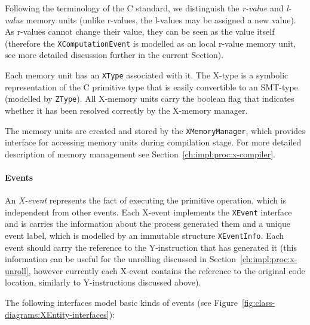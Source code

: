 Following the terminology of the C standard, we distinguish the \textit{r-value} and \textit{l-value} memory units (unlike r-values, the l-values may be assigned a new value).
As r-values cannot change their value, they can be seen as the value itself (therefore the \texttt{XComputationEvent} is modelled as an local r-value memory unit, see more detailed discussion further in the current Section).

Each memory unit has an \texttt{XType} associated with it.
The X-type is a symbolic representation of the C primitive type%
%
%
that is easily convertible to an SMT-type (modelled by \texttt{ZType}). %
All X-memory units carry the boolean flag that indicates whether it has been resolved correctly by the X-memory manager.

The memory units are created and stored by the \texttt{XMemoryManager}, which provides interface for accessing memory units during compilation stage.
For more detailed description of memory management see Section~\ref{ch:impl:proc:x-compiler}.


\paragraph{Events}

An \textit{X-event} represents the fact of executing the primitive operation, which is independent from other events.
Each X-event implements the \texttt{XEvent} interface and is carries the information about the process generated them and a unique event label, which is modelled by an immutable structure \texttt{XEventInfo}.
Each event should carry the reference to the Y-instruction that has generated it (this information can be useful for the unrolling discussed in Section~\ref{ch:impl:proc:x-unroll}, however currently each X-event contains the reference to the original code location, similarly to Y-instructions discussed above).

The following interfaces model basic kinds of events (see Figure~\ref{fig:class-diagrams:XEntity-interfaces}):


